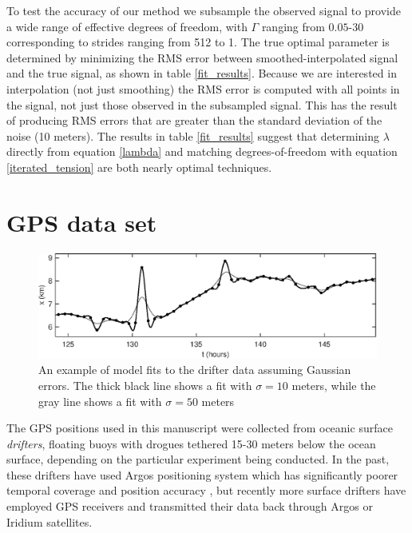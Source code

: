 \documentclass[10pt,journal]{IEEEtran}
\begin{document}
To test the accuracy of our method we subsample the observed signal to provide a wide range of effective degrees of freedom, with $\Gamma$ ranging from $0.05$-$30$ corresponding to strides ranging from 512 to 1. The true optimal parameter is determined by minimizing the RMS error between smoothed-interpolated signal and the true signal, as shown in table \ref{fit_results}. Because we are interested in interpolation (not just smoothing) the RMS error is computed with all points in the signal, not just those observed in the subsampled signal. This has the result of producing RMS errors that are greater than the standard deviation of the noise (10 meters). The results in table \ref{fit_results} suggest that determining $\lambda$ directly from equation \ref{lambda} and matching degrees-of-freedom with equation \ref{iterated_tension} are both nearly optimal techniques.



\section{GPS data set}
\label{sec:drifter_data_set}

\begin{figure}[t]
  \centerline{\includegraphics[width=39pc,angle=0]{figures/gaussianfit}}
  
  \caption{An example of model fits to the drifter data assuming Gaussian errors. The thick black line shows a fit with $\sigma=10$ meters, while the gray line shows a fit with $\sigma=50$ meters}
  \label{gaussianfit}
\end{figure}

The GPS positions used in this manuscript were collected from oceanic surface \emph{drifters}, floating buoys with drogues tethered 15-30 meters below the ocean surface, depending on the particular experiment being conducted. In the past, these drifters have used Argos positioning system which has significantly poorer temporal coverage and position accuracy \cite{elipot2016-jgr}, but recently more surface drifters have employed GPS receivers and transmitted their data back through Argos or Iridium satellites.
\end{document}
